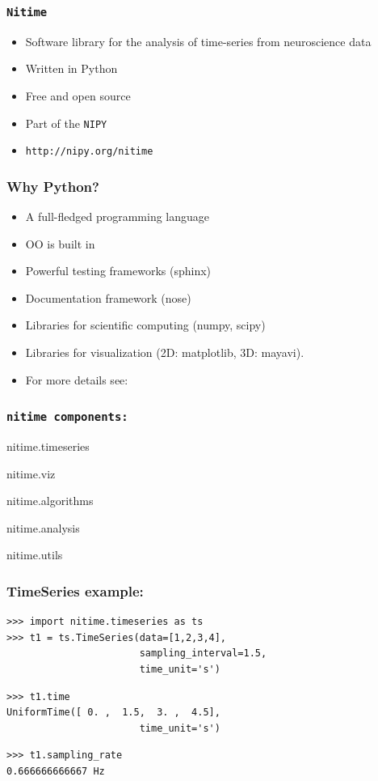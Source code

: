 \documentclass{beamer}
\begin{document}
\begin{frame}
\frametitle{\tt{Nitime}}
\begin{itemize}
\pause
\item
Software library for the analysis of time-series from neuroscience data
\pause
\item
Written in Python
\pause
\item 
Free and open source
\pause
\item
Part of the \tt{NIPY} 
\pause
\item
\tt{http://nipy.org/nitime}
\end{itemize}
\end{frame}

\begin{frame}
\frametitle{Why Python?}
\begin{itemize}
\pause
\item
A full-fledged programming language
\pause
\item
OO is built in 
\pause
\item
Powerful testing frameworks (sphinx)
\pause
\item
Documentation framework (nose) 
\pause
\item
Libraries for scientific computing (numpy, scipy)
\pause
\item
Libraries for visualization (2D: matplotlib, 3D: mayavi).
\pause
\item 
For more details see: 
\end{itemize}
\end{frame}

\begin{frame}
\frametitle{\tt{nitime} components:}
\begin{itemize}
\begin{tt}
\pause
\item
nitime.timeseries
\pause
\item
nitime.viz
\pause
\item
nitime.algorithms
\pause
\item
nitime.analysis
\pause 
\item
nitime.utils
\end{tt}
\end{itemize}
\end{frame}

\begin{frame}[fragile]
\frametitle{TimeSeries example:}
\pause
\begin{lstlisting}
>>> import nitime.timeseries as ts 
>>> t1 = ts.TimeSeries(data=[1,2,3,4],
                       sampling_interval=1.5,
                       time_unit='s')
\end{lstlisting}

\pause
\begin{lstlisting}
>>> t1.time
UniformTime([ 0. ,  1.5,  3. ,  4.5], 
                       time_unit='s')
\end{lstlisting}

\pause
\begin{lstlisting}
>>> t1.sampling_rate
0.666666666667 Hz
\end{lstlisting}

\end{frame}
\end{document}

